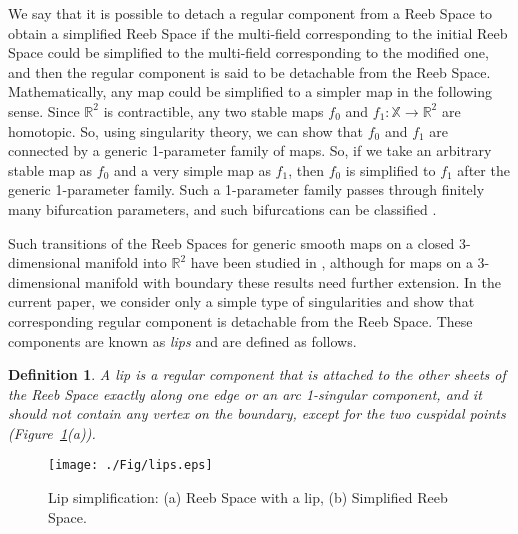 \documentclass[twocolumn]{article}
\newcommand{\X}{\mathbb{X}}
\newcommand{\R}{\mathbb{R}}
\newtheorem{dfn}{Definition}[section]
\begin{document}
We say that it is possible to detach a regular component from a Reeb Space
to obtain a simplified Reeb Space
if the multi-field corresponding to
the initial Reeb Space could be simplified 
to the multi-field corresponding  to the modified one, 
and then the regular component is said to be detachable from the Reeb Space.
Mathematically, any map could be simplified to a simpler map
in the following sense. Since $\R^2$ is contractible,
any two stable maps $f_0$ and $f_1 : \X \rightarrow \R^2$ are homotopic.
So, using singularity theory, we can show that
$f_0$ and $f_1$ are connected by a generic 1-parameter
family of maps. So, if we take an arbitrary stable
map as $f_0$ and a very simple map as $f_1$, then $f_0$
is simplified to $f_1$ after the generic 1-parameter
family. Such a 1-parameter family passes through
finitely many bifurcation parameters, and such
bifurcations can be classified \cite{Mata-Lorenzo-1989}. 


Such transitions of the Reeb Spaces for generic smooth maps on a
closed 3-dimensional manifold into $\R^2$  have been studied in \cite{Mata-Lorenzo-1989},
although for maps on a 3-dimensional
manifold with boundary these results need further extension. In the current paper, we consider only   
a simple type of singularities and show that corresponding regular
component is detachable from the Reeb Space.
These components are known as \emph{lips}
and are defined as follows.
\begin{dfn}
\label{dfn:lips}
A lip is a regular component that is attached to the other
sheets of the Reeb Space exactly along one edge or an arc 1-singular component,
and it should not contain any vertex on the boundary,
except for the two cuspidal points (Figure~\ref{fig:lips-dfn}(a)).
\end{dfn}
\begin{figure}[h!]
\begin{center}
\texttt{[image: ./Fig/lips.eps]}
\caption{Lip simplification: (a) Reeb Space with a lip, (b) Simplified
  Reeb Space.}
\label{fig:lips-dfn}
\end{center}
\end{figure} 
\end{document}
